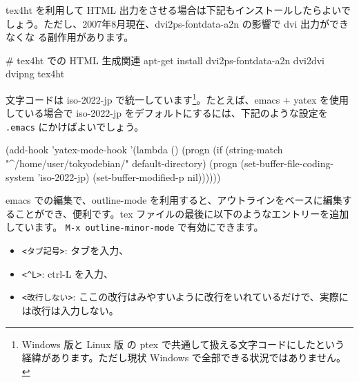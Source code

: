 \documentclass[mingoth,a4paper]{jsarticle}
\begin{document}
tex4ht を利用して HTML 出力をさせる場合は下記もインストールしたらよいで
しょう。ただし、2007年8月現在、dvi2ps-fontdata-a2n の影響で dvi 出力ができなくな
る副作用があります。
\begin{commandline}
# tex4ht での HTML 生成関連
apt-get install dvi2ps-fontdata-a2n dvi2dvi dvipng tex4ht
\end{commandline}

文字コードは iso-2022-jp で統一しています\footnote{Windows 版と Linux 版
の ptex で共通して扱える文字コードにしたという経緯があります。ただし現状
Windows で全部できる状況ではありません。}。たとえば、emacs + yatex を使用
している場合で iso-2022-jp をデフォルトにするには、下記のような設定を
\texttt{.emacs} にかけばよいでしょう。

\begin{commandline}
(add-hook 'yatex-mode-hook
	  '(lambda () 
	     (progn 
	       (if (string-match "^/home/user/tokyodebian/" default-directory)
		   (progn (set-buffer-file-coding-system 'iso-2022-jp)
			  (set-buffer-modified-p nil))))))
\end{commandline}


emacs での編集で、outline-mode を利用すると、アウトラインをベースに編集す
ることができ、便利です。tex ファイルの最後に以下のようなエントリーを追加
しています。
\texttt{M-x outline-minor-mode} で有効にできます。

\begin{commandline}
;;; Local Variables: ***
;;; outline-regexp: "\\([ <タブ記号>]*\\\\\\(documentstyle\\|documentclass\\|<改行しない>
dancersection\\)\\*?[ <タブ記号>]*[[{]\\|[%
;;; End: ***
\end{commandline}

\begin{itemize}
 \item 
 \verb!<タブ記号>!: タブを入力、
 \item  \verb!<^L>!: ctrl-L を入力、
 \item  \verb!<改行しない>!: ここの改行はみやすいように改行をいれているだけで、実際には改行は入力しない。
\end{itemize}
\end{document}

